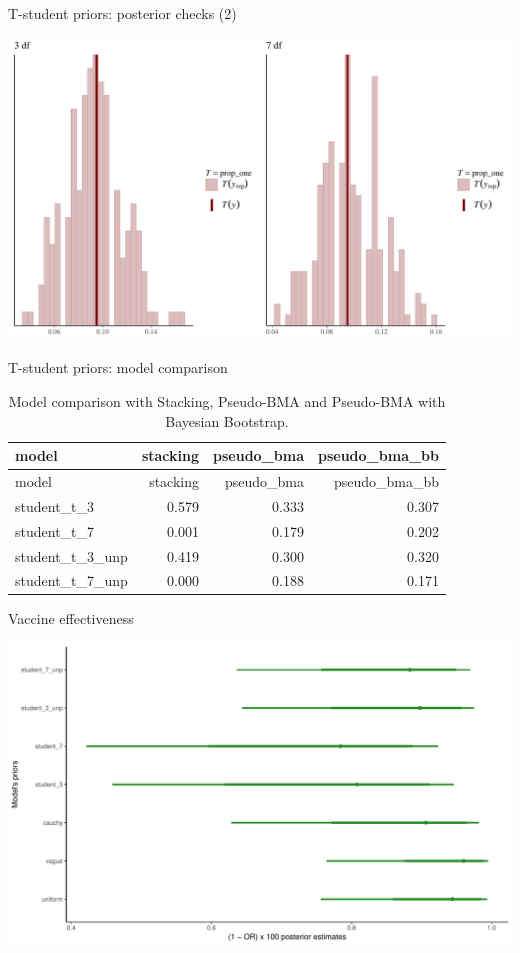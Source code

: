 \documentclass[ignorenonframetext,a4paper]{beamer}
\begin{document}
\begin{frame}{T-student priors: posterior checks (2)}

\includegraphics{DB_presentation_case_study_files/figure-beamer/unnamed-chunk-33-1.pdf}

\end{frame}

\begin{frame}{T-student priors: model comparison}

\begin{longtable}[]{@{}lrrr@{}}
\caption{Model comparison with Stacking, Pseudo-BMA and Pseudo-BMA with
Bayesian Bootstrap.}\tabularnewline
\toprule
model & stacking & pseudo\_bma & pseudo\_bma\_bb\tabularnewline
\midrule
\endfirsthead
\toprule
model & stacking & pseudo\_bma & pseudo\_bma\_bb\tabularnewline
\midrule
\endhead
student\_t\_3 & 0.579 & 0.333 & 0.307\tabularnewline
student\_t\_7 & 0.001 & 0.179 & 0.202\tabularnewline
student\_t\_3\_unp & 0.419 & 0.300 & 0.320\tabularnewline
student\_t\_7\_unp & 0.000 & 0.188 & 0.171\tabularnewline
\bottomrule
\end{longtable}

\end{frame}

\begin{frame}{Vaccine effectiveness}

\includegraphics{DB_presentation_case_study_files/figure-beamer/unnamed-chunk-35-1.pdf}

\end{frame}
\end{document}
